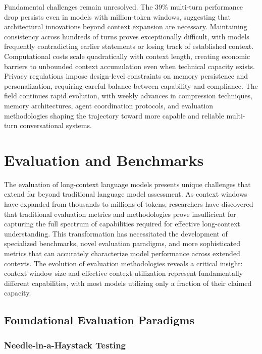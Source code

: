 \documentclass[11pt,letterpaper]{article}
\begin{document}
Fundamental challenges remain unresolved. The 39\% multi-turn performance drop persists even in models with million-token windows, suggesting that architectural innovations beyond context expansion are necessary. Maintaining consistency across hundreds of turns proves exceptionally difficult, with models frequently contradicting earlier statements or losing track of established context. Computational costs scale quadratically with context length, creating economic barriers to unbounded context accumulation even when technical capacity exists. Privacy regulations impose design-level constraints on memory persistence and personalization, requiring careful balance between capability and compliance. The field continues rapid evolution, with weekly advances in compression techniques, memory architectures, agent coordination protocols, and evaluation methodologies shaping the trajectory toward more capable and reliable multi-turn conversational systems.


\section{Evaluation and Benchmarks}
\label{sec:evaluation}

The evaluation of long-context language models presents unique challenges that extend far beyond traditional language model assessment. As context windows have expanded from thousands to millions of tokens, researchers have discovered that traditional evaluation metrics and methodologies prove insufficient for capturing the full spectrum of capabilities required for effective long-context understanding. This transformation has necessitated the development of specialized benchmarks, novel evaluation paradigms, and more sophisticated metrics that can accurately characterize model performance across extended contexts. The evolution of evaluation methodologies reveals a critical insight: context window size and effective context utilization represent fundamentally different capabilities, with most models utilizing only a fraction of their claimed capacity.

\subsection{Foundational Evaluation Paradigms}

\subsubsection{Needle-in-a-Haystack Testing}
\end{document}
